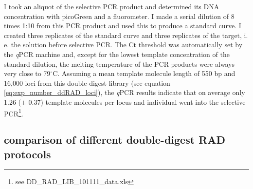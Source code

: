 \documentclass[a4paper,12pt,times,print,index,custombib,custommargin]{PhDThesisPSnPDF}\usepackage[]{graphicx}\usepackage[]{color}
\begin{document}
I took an aliquot of the selective PCR product and determined its DNA concentration with picoGreen and a fluorometer. I made a serial dilution of 8 times 1:10 from this PCR product and used this to produce a standard curve. I created three replicates of the standard curve and three replicates of the target, i. e. the solution before selective PCR. The \gls{Ct} threshold was automatically set by the \textit{q}PCR machine and, except for the lowest template concentration of the standard dilution, the melting temperature of the PCR products were always very close to 79$^{\circ}$C. Assuming a mean template molecule length of 550 \gls{bp} and 16,000 loci from this double-digest library (see equation \ref{eq:exp_number_ddRAD_loci}), the \textit{q}PCR results indicate that on average only 1.26 ($\pm$ 0.37) template molecules per locus and individual went into the selective PCR\footnote{see DD\_RAD\_LIB\_101111\_data.xls}.


\FloatBarrier
\subsection{comparison of different double-digest RAD protocols}
\pagebreak
\end{document}

